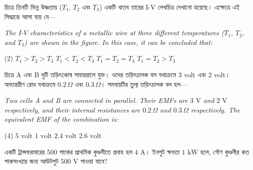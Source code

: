\documentclass[13pt,a4paper]{extarticle}
\newcommand{\questionheader}[1]{%
  \vspace{0.4cm}\noindent{\Large\textbf{#1}}\vspace{0.12cm}%
}
\begin{document}
{\bengalifont চিত্রে তিনটি ভিন্ন উষ্ণতায় ($T_1$, $T_2$ এবং $T_3$) একটি ধাতব তারের I-V লেখচিত্র দেখানো হয়েছে। এক্ষেত্রে এই সিদ্ধান্তে আসা যায় যে—}

\vspace{0.08cm}
\textit{The $I\text{-}V$ characteristics of a metallic wire at three different temperatures ($T_1$, $T_2$, and $T_3$) are shown in the figure. In this case, it can be concluded that:}

\begin{center}
\end{center}

\begin{tasks}(2)
  \task $T_1 > T_2 > T_3$
  \task $T_1 < T_2 < T_3$
  \task $T_1 = T_2 = T_3$
  \task $T_1 = T_2 > T_3$
\end{tasks}

\questionheader{Question 30}

{\bengalifont চিত্রে A এবং B দুটি তড়িৎকোষ সমান্তরালে যুক্ত। ওদের তড়িৎচালক বল যথাক্রমে 3 volt এবং 2 volt। অভ্যন্তরীণ রোধ যথাক্রমে $0.2\,\Omega$ এবং $0.3\,\Omega$। সমবায়টির তুল্য তড়িৎচালক বল হল—}

\vspace{0.08cm}
\textit{Two cells A and B are connected in parallel. Their EMFs are $3\text{ V}$ and $2\text{ V}$ respectively, and their internal resistances are $0.2\,\Omega$ and $0.3\,\Omega$ respectively. The equivalent EMF of the combination is:}

\begin{tasks}(4)
  \task $5\text{ volt}$
  \task $1\text{ volt}$
  \task $2.4\text{ volt}$
  \task $2.6\text{ volt}$
\end{tasks}

\questionheader{Question 31}

{\bengalifont একটি ট্রান্সফরমারের 500 পাকের প্রাথমিক কুণ্ডলীতে প্রবাহ হল $4\text{ A}$। ইনপুট ক্ষমতা $1\text{ kW}$ হলে, গৌণ কুণ্ডলীর কত পাকসংখ্যার জন্য আউটপুট $500\text{ V}$ পাওয়া যাবে?}
\end{document}
